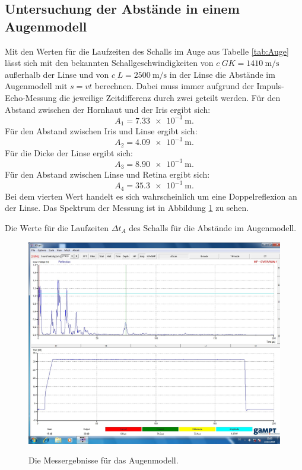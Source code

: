 \subsection{Untersuchung der Abstände in einem Augenmodell}

\noindent Mit den Werten für die Laufzeiten des Schalls im Auge aus Tabelle \ref{tab:Auge} lässt sich mit den bekannten Schallgeschwindigkeiten von $c_.{GK}=\SI{1410}{\meter\per\second}$ \cite{US1} außerhalb der Linse und von $c_.{L}=\SI{2500}{\meter\per\second}$ \cite{US1} in der Linse die Abstände im Augenmodell mit $s=vt$ berechnen. Dabei muss immer aufgrund der Impuls-Echo-Messung die jeweilige Zeitdifferenz durch zwei geteilt werden. Für den Abstand zwischen der Hornhaut und der Iris ergibt sich:
\begin{equation*}
A_1=\SI{7.33e-3}{\meter}\text{.}
\end{equation*}
Für den Abstand zwischen Iris und Linse ergibt sich:
\begin{equation*}
A_2=\SI{4.09e-3}{\meter}\text{.}
\end{equation*}
Für die Dicke der Linse ergibt sich:
\begin{equation*}
A_3=\SI{8.90e-3}{\meter}\text{.}
\end{equation*}
Für den Abstand zwischen Linse und Retina ergibt sich:
\begin{equation*}
A_4=\SI{35,3e-3}{\meter}\text{.}
\end{equation*}
Bei dem vierten Wert handelt es sich wahrscheinlich um eine Doppelreflexion an der Linse.
Das Spektrum der Messung ist in Abbildung \ref{fig:Auge} zu sehen.

\begin{table}
	\centering
	\caption{Die Werte für die Laufzeiten $\Delta t_A$ des Schalls für die Abstände im Augenmodell.}
	
	\label{tab:Auge}
\end{table}

\begin{figure}
	\centering
	\caption{Die Messergebnisse für das Augenmodell.}
	\includegraphics[width=\linewidth-30pt,height=\textheight-30pt,keepaspectratio]{content/images/AUGE.jpg}
	\label{fig:Auge}
\end{figure}